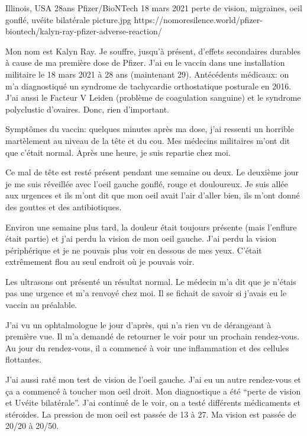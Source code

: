           {Illinois, USA}
          {28ans}
          {Pfizer/BioNTech}
          {18 mars 2021}
          {perte de vision, migraines, oeil gonflé, uvéite bilatérale}
          {picture.jpg}
          {https://nomoresilence.world/pfizer-biontech/kalyn-ray-pfizer-adverse-reaction/}
          {

\normalsize

Mon nom est Kalyn Ray. Je souffre, jusqu'à présent, d'effets secondaires
durables à cause de ma première dose de Pfizer. J'ai eu le vaccin dans une
installation militaire le 18 mars 2021 à 28 ans (maintenant 29).  Antécédents
médicaux: on m'a diagnostiqué un syndrome de tachycardie orthostatique posturale
en 2016. J'ai aussi le Facteur V Leiden (problème de coagulation sanguine) et le
syndrome polyclustic d'ovaires. Donc, rien d'important.

Symptômes du vaccin: quelques minutes après ma dose, j'ai ressenti un horrible
martèlement au niveau de la tête et du cou. Mes médecins militaires m'ont dit
que c'était normal. Après une heure, je suis repartie chez moi.

Ce mal de tête est resté présent pendant une semaine ou deux. Le deuxième jour
je me suis réveillée avec l'oeil gauche gonflé, rouge et douloureux. Je suis
allée aux urgences et ils m'ont dit que mon oeil avait l'air d'aller bien, ils
m'ont donné des gouttes et des antibiotiques.

Environ une semaine plus tard, la douleur était toujours présente (mais
l'enflure était partie) et j'ai perdu la vision de mon oeil gauche. J'ai perdu
la vision périphérique et je ne pouvais plus voir en dessous de mes
yeux. C'était extrêmement flou au seul endroit où je pouvais voir.

Les ultrasons ont présenté un résultat normal. Le médecin m'a dit que je n'étais
pas une urgence et m'a renvoyé chez moi. Il se fichait de savoir si j'avais eu
le vaccin au préalable.

J'ai vu un ophtalmologue le jour d'après, qui n'a rien vu de dérangeant à
première vue. Il m'a demandé de retourner le voir pour un prochain
rendez-vous. Au jour du rendez-vous, il a commencé à voir une inflammation et
des cellules flottantes.

J'ai aussi raté mon test de vision de l'oeil gauche. J'ai eu un autre
rendez-vous et ça a commencé à toucher mon oeil droit. Mon diagnostique a été
“perte de vision et Uvéite bilatérale”. J'ai continué de le voir, on a testé
différents médicaments et stéroides. La pression de mon oeil est passée de 13 à
27. Ma vision est passée de 20/20 à 20/50.

}

